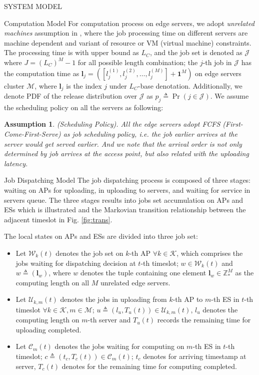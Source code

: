 \documentclass[10pt, conference, letterpaper]{IEEEtran}
\newtheorem{assumption}{Assumption}
\newcommand{\domZ}{\mathbb{Z}_{*}}
\newcommand{\vecOne}{\mathbf{1}}
\newcommand{\define}{\triangleq}
\renewcommand{\vec}{\mathbf}
\newcommand{\apSet}{\mathcal{K}}
\newcommand{\esSet}{\mathcal{M}}
\newcommand{\jSet}{\mathcal{J}}
\newcommand{\wSet}{\mathcal{W}}
\newcommand{\uSet}{\mathcal{U}}
\newcommand{\cSet}{\mathcal{C}}
\begin{document}
\begin{section}{SYSTEM MODEL}
        \begin{subsection}{Computation Model}
            For computation process on edge servers, we adopt \emph{unrelated machines} assumption in \cite{tan-online}, where the job processing time on different servers are machine dependent and variant of resource or VM (virtual machine) constraints. The processing time is with upper bound as $L_C$, and the job set is denoted as $\mathcal{J}$ {\color{red}where $J=(L_C)^M-1$ for all possible length combination; the $j$-th job in $\jSet$ has the computation time as $\vec{l}_j = ([l_j^{(1)}, l_j^{(2)}, \dots, l_j^{(M)}] + \vecOne^M)$ on edge servers cluster $\esSet$, where $\vec{l}_j$ is the index $j$ under $L_C$-base denotation.} Additionally, we denote PDF of the release distribution over $\jSet$ as $p_j \define \Pr(j\in\jSet)$.
            We assume the scheduling policy on all the servers  as following:
            \begin{assumption}
                (Scheduling Policy).
                All the edge servers adopt \emph{FCFS} (First-Come-First-Serve) as job scheduling policy, i.e. the job earlier arrives at the server would get served earlier. And we note that the arrival order is not only determined by job arrives at the access point, but also related with the uploading latency.
            \end{assumption}
        \end{subsection}

        \begin{subsection}{Job Dispatching Model}
            The job dispatching process is composed of three stages: waiting on APs for uploading, in uploading to servers, and waiting for service in servers queue. The three stages results into jobs set accumulation on APs and ESs which is illustrated and the Markovian transition relationship between the adjacent timeslot in Fig. \ref{fig:trans}.

            The local states on APs and ESs are divided into three job set:
            \begin{itemize}
                \item Let $\wSet_{k}(t)$ denotes the job set on $k$-th AP $\forall k \in \apSet$, which comprises the jobs waiting for dispatching decision at $t$-th timeslot; $w \in \wSet_{k}(t)$ and $w \triangleq (\vec{l}_w)$, where $w$ denotes the tuple containing one element $\vec{l}_w \in \domZ^M$ as the computing length on all $M$ unrelated edge servers.
                \item Let $\uSet_{k,m}(t)$ denotes the jobs in uploading from $k$-th AP to $m$-th ES in $t$-th timeslot $\forall k \in \apSet, m \in \esSet$; $u \triangleq (l_u, T_{u}(t)) \in \uSet_{k,m}(t)$, $l_u$ denotes the computing length on $m$-th server and $T_{u}(t)$ records the remaining time for uploading completed.
                \item Let $\cSet_{m}(t)$ denotes the jobs waiting for computing on $m$-th ES in $t$-th timeslot; $c \triangleq (t_c, T_{c}(t)) \in \cSet_{m}(t)$; $t_c$ denotes for arriving timestamp at server, $T_{c}(t)$ denotes for the remaining time for computing completed.
            \end{itemize}


\end{subsection}
\end{section}
\end{document}
